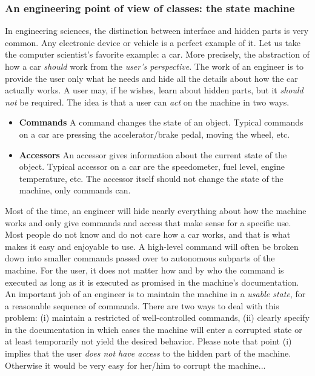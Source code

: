 \documentclass[12pt]{article}
\begin{document}
\subsubsection{An engineering point of view of classes: the state machine}
In engineering sciences, the distinction between interface and hidden parts is very common. Any electronic device or vehicle is a perfect example of it. Let us take the computer scientist's favorite example: a car. More precisely, the abstraction of how a car \emph{should} work from the \emph{user's perspective}. The work of an engineer is to provide the user only what he needs and hide all the details about how the car actually works. A user may, if he wishes, learn about hidden parts, but it \emph{should not} be required. The idea is that a user can \emph{act} on the machine in two ways.
\begin{itemize}
	\item \textbf{Commands} A command changes the state of an object. Typical commands on a car are pressing the accelerator/brake pedal, moving the wheel, etc.
	\item \textbf{Accessors} An accessor gives information about the current state of the object. Typical accessor on a car are the speedometer, fuel level, engine temperature, etc. The accessor itself should not change the state of the machine, only commands can.
\end{itemize}
Most of the time, an engineer will hide nearly everything about how the machine works and only give commands and access that make sense for a specific use. Most people do not know and do not care how a car works, and that is what makes it easy and enjoyable to use. A high-level command will often be broken down into smaller commands passed over to autonomous subparts of the machine. For the user, it does not matter how and by who the command is executed as long as it is executed as promised in the machine's documentation. An important job of an engineer is to maintain the machine in a \emph{usable state}, for a reasonable sequence of commands. There are two ways to deal with this problem: (i) maintain a restricted of well-controlled commands, (ii) clearly specify in the documentation in which cases the machine will enter a corrupted state or at least temporarily not yield the desired behavior. Please note that point (i) implies that the user \emph{does not have access} to the hidden part of the machine. Otherwise it would be very easy for her/him to corrupt the machine...
\end{document}
